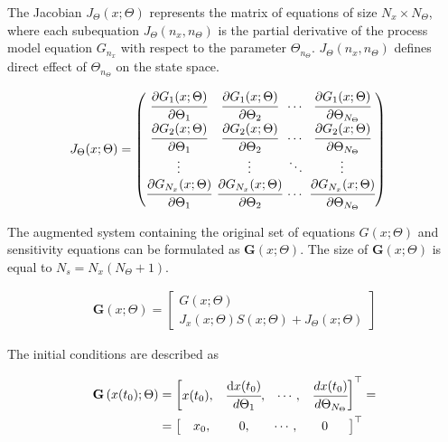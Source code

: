 \documentclass[../Article_Sensitivity_Analsysis.tex]{subfiles}
\begin{document}
	The Jacobian ${J_\Theta}(x;\Theta)$ represents the matrix of equations of size $N_x \times N_\Theta$, where each subequation ${J_\Theta}(n_x,n_\Theta)$ is the partial derivative of the process model equation $G_{n_x}$ with respect to the parameter $\Theta_{n_\Theta}$. ${J_\Theta}(n_x,n_\Theta)$ defines direct effect of $\Theta_{n_\Theta}$ on the state space.
	
	{\footnotesize
		\begin{align}
			{J_\Theta}(x;\Theta) & =
			\begingroup %
			\setlength\arraycolsep{2pt}
			\begin{pmatrix}
				\cfrac{\partial {G_{1}}(x;\Theta)}{\partial {\Theta_{1}}} & \cfrac{\partial {G_{1}}(x;\Theta)}{\partial {\Theta_{2}}} & \cdots & \cfrac{\partial {G_{1}}(x;\Theta)}{\partial {\Theta_{N_\Theta}}}\\
				\cfrac{\partial {G_{2}}(x;\Theta)}{\partial {\Theta_{1}}} & \cfrac{\partial {G_{2}}(x;\Theta)}{\partial {\Theta_{2}}} & \cdots & \cfrac{\partial {G_{2}}(x;\Theta)}{\partial {\Theta_{N_\Theta}}}\\
				\vdots & \vdots & \ddots & \vdots\\
				\cfrac{\partial {G_{N_x}}(x;\Theta)}{\partial {\Theta_{1}}} & \cfrac{\partial {G_{N_x}}(x;\Theta)}{\partial {\Theta_{2}}} & \cdots & \cfrac{\partial {G_{N_x}}(x;\Theta)}{\partial {\Theta_{N_\Theta}}}
			\end{pmatrix}
			\endgroup
	\end{align}}
	
	The augmented system containing the original set of equations ${G}(x;\Theta)$ and sensitivity equations can be formulated as ${\textbf{G}}\left(x;\Theta\right)$. The size of ${\textbf{G}}\left(x;\Theta\right)$ is equal to $N_s = N_x(N_\Theta + 1)$.
	
	{\footnotesize
		\begin{align}
			{\textbf{G}}\left(x;\Theta\right) = 
			\begin{bmatrix}
				{G}(x;\Theta)\\
				{J_x}(x;\Theta)S(x;\Theta) + {J_\Theta}(x;\Theta)
			\end{bmatrix}
	\end{align} }
	
	The initial conditions are described as
	
	{\footnotesize
		\begin{align}
			{\textbf{G}}\left(x(t_0);\Theta\right)  &= 
			\begin{bmatrix}
                x(t_0),						               &
				\cfrac{ \text{d}x(t_0) }{ d{\Theta_1} },		   &
				\cdots,					 				   &
				\cfrac{ dx(t_0) }{ d{\Theta_{N_\Theta}} }            
			\end{bmatrix}^\top = \\ &=
            \begin{bmatrix} 
                \quad x_0,	                               &
				\quad ~0,		                           &
			    \quad \cdots,			                   &
				\quad 0 \quad~~
			\end{bmatrix}^\top
	\end{align} }
	
\end{document}
